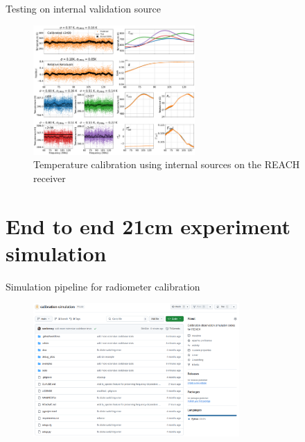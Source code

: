 \documentclass[aspectratio=169]{beamer}
\begin{document}
\begin{frame}{\small{Testing on internal validation source}}
	\begin{figure}
		\centering
		\includegraphics[width=0.55\textwidth]{images/temps.pdf}
		\caption{Temperature calibration using internal sources on the REACH receiver}
	\end{figure}
\end{frame}

\section{End to end 21cm experiment simulation}

\begin{frame}{\small{Simulation pipeline for radiometer calibration}}
	\begin{figure}
		\centering
		\includegraphics[width=0.7\textwidth]{images/githubrepo.png}
	\end{figure}
\end{frame}
\end{document}
